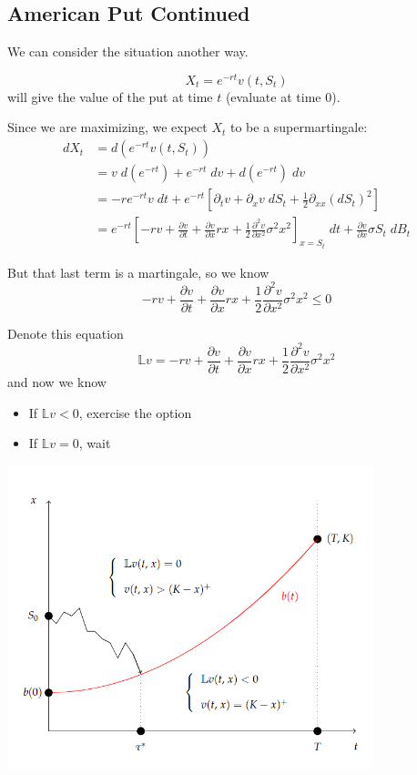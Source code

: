 \documentclass[12pt]{report}
\renewcommand{\L}{\mathbb{L}}
\begin{document}
    \subsection{American Put Continued}
        We can consider the situation another way. 
        
        \[X_t  = e^{-rt} v(t, S_t)\]
        will give the value of the put at time $t$ (evaluate at time $0$). 

        Since we are maximizing, we expect $X_t$ to be a supermartingale:
        \begin{align*}
            dX_t &= d(e^{-rt} v(t, S_t))\\ 
                &= v\; d(e^{-rt}) + e^{-rt} \; dv + d(e^{-rt})\; dv\\ 
                &= -re^{-rt} v\; dt + e^{-rt}\left[\partial_t v + \partial_x v \; dS_t + \frac{1}{2}\partial_{xx} (dS_t)^2\right]\\ 
                &= e^{-rt} \left[-rv + \frac{\partial v}{\partial t} + \frac{\partial v}{\partial x} rx + \frac{1}{2} \frac{\partial^2 v}{\partial x^2} \sigma^2 x^2\right]_{x = S_t}\; dt + \frac{\partial v}{\partial x} \sigma S_t\; dB_t
        \end{align*}
        
        But that last term is a martingale, so we know 
        \[-rv  + \frac{\partial v}{\partial t} + \frac{\partial v}{\partial x} rx + \frac{1}{2} \frac{\partial^2 v}{\partial x^2} \sigma^2 x^2 \leq 0\] 
        
        Denote this equation 
        \[\L v = -rv  + \frac{\partial v}{\partial t} + \frac{\partial v}{\partial x} rx + \frac{1}{2} \frac{\partial^2 v}{\partial x^2} \sigma^2 x^2 \]
        and now we know 
        \begin{itemize}
            \item If $\L v< 0$, exercise the option 
            \item If $\L v = 0$, wait
        \end{itemize}

        \begin{center}
            \includegraphics[width=0.8\textwidth]{Images/Free boundary.png}
        \end{center}
\end{document}
